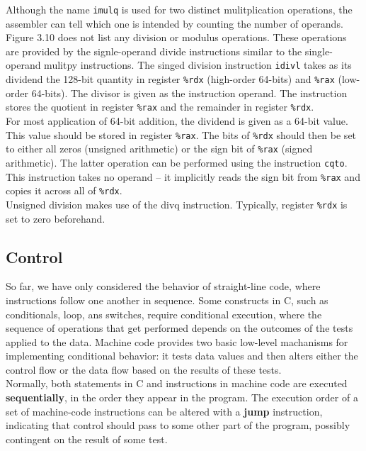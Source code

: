 \documentclass[11pt]{article}
\begin{document}
Although the name \texttt{imulq} is used for two distinct mulitplication operations, the assembler can tell which one is intended by counting the number of operands.\\

Figure 3.10 does not list any division or modulus operations. These operations are provided by the signle-operand divide instructions similar to the single-operand mulitpy instructions. The singed division instruction \texttt{idivl} takes as its dividend the 128-bit quantity in register \texttt{\%rdx} (high-order 64-bits) and \texttt{\%rax} (low-order 64-bits). The divisor is given as the instruction operand. The instruction stores the quotient in register \texttt{\%rax} and the remainder in register \texttt{\%rdx}.\\

For most application of 64-bit addition, the dividend is given as a 64-bit value. This value should be stored in register \texttt{\%rax}. The bits of \texttt{\%rdx} should then be set to either all zeros (unsigned arithmetic) or the sign bit of \texttt{\%rax} (signed arithmetic). The latter operation can be performed using the instruction \texttt{cqto}. This instruction takes no operand -- it implicitly reads the sign bit from \texttt{\%rax} and copies it across all of \texttt{\%rdx}.\\

Unsigned division makes use of the divq instruction. Typically, register \texttt{\%rdx} is set to zero beforehand.\\


\subsection{Control}
\label{sec:orgd8022a6}
So far, we have only considered the behavior of straight-line code, where instructions follow one another in sequence. Some constructs in C, such as conditionals, loop, ans switches, require conditional execution, where the sequence of operations that get performed depends on the outcomes of the tests applied to the data. Machine code provides two basic low-level machanisms for implementing conditional behavior: it tests data values and then alters either the control flow or the data flow based on the results of these tests.\\

Normally, both statements in C and instructions in machine code are executed \textbf{sequentially}, in the order they appear in the program. The execution order of a set of machine-code instructions can be altered with a \textbf{jump} instruction, indicating that control should pass to some other part of the program, possibly contingent on the result of some test.\\
\end{document}
